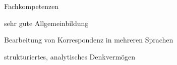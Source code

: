 \pagebreak
\makecvheader
{}
\begin{personality}{Fachkompetenzen}
\begin{competence}
    {
      \begin{cvitems}
        \item {sehr gute Allgemeinbildung}
        \item {Bearbeitung von Korrespondenz in mehreren Sprachen}
        \item {strukturiertes, analytisches Denkvermögen}
      \end{cvitems}
    }
\end{competence}
\end{personality}